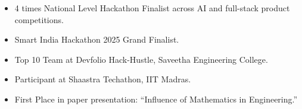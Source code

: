 \documentclass[letterpaper,11pt]{article}
\begin{document}
\begin{itemize}[leftmargin=0.15in, label={}]
  \item 4 times National Level Hackathon Finalist across AI and full-stack product competitions.
  \item Smart India Hackathon 2025 Grand Finalist.
  \item Top 10 Team at Devfolio Hack-Hustle, Saveetha Engineering College.
  \item Participant at Shaastra Techathon, IIT Madras.
  \item First Place in paper presentation: ``Influence of Mathematics in Engineering.''
\end{itemize}
\vspace{-15pt}
\end{document}
